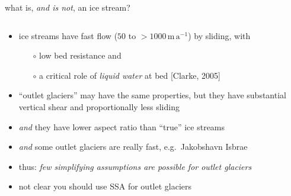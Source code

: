 \begin{frame}{what is, \emph{and is not}, an ice stream?}

\begin{columns}
\begin{column}{0.6\textwidth}
\begin{itemize}
\item ice streams have fast flow ($50$ to $>1000 \,\text{m}\,\text{a}^{-1}$) by sliding, with
  \small
  \begin{itemize}
  \item[$\circ$] low bed resistance and
  \item[$\circ$] a critical role of \emph{liquid water} at bed [Clarke, 2005]
  \end{itemize}
  \normalsize
\item ``outlet glaciers'' may have the same properties, but they have substantial vertical shear and proportionally less sliding
\item \emph{and} they have lower aspect ratio than ``true'' ice streams
\item \emph{and} some outlet glaciers are really fast, e.g.~Jakobshavn Isbrae
\item thus: \emph{few simplifying assumptions are possible for outlet glaciers}
\item not clear you should use SSA for outlet glaciers
\end{itemize}
\end{column}

\begin{column}{0.4\textwidth}
\end{column}
\end{columns}
\end{frame}



